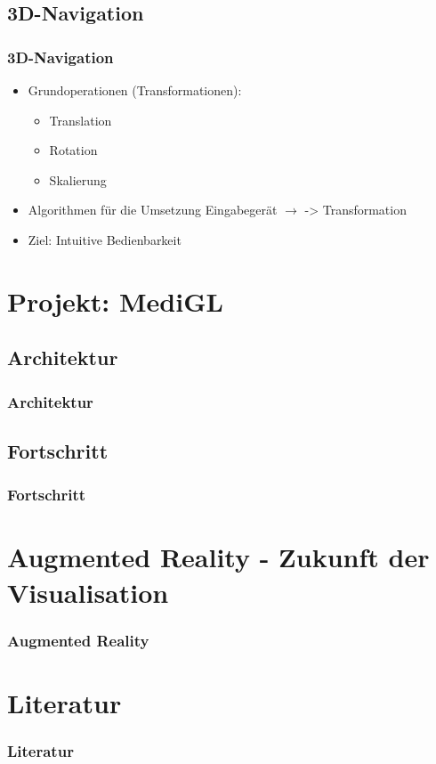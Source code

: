 \documentclass[14pt]{beamer}
\begin{document}
\subsection{3D-Navigation}
\begin{frame}
 \frametitle{3D-Navigation}
 \begin{itemize}
  \item Grundoperationen (Transformationen):
  \begin{itemize}
   \item Translation
   \item Rotation
   \item Skalierung
  \end{itemize}
  \item Algorithmen für die Umsetzung Eingabegerät $\rightarrow$ -> Transformation
  \item Ziel: Intuitive Bedienbarkeit
 \end{itemize}
\end{frame}
%
%
%
\section{Projekt: MediGL}
%
\subsection{Architektur}
\begin{frame}
\frametitle{Architektur}
\end{frame}
%
\subsection{Fortschritt}
\begin{frame}
\frametitle{Fortschritt}
\end{frame}
%
%
%
\section{Augmented Reality - Zukunft der Visualisation}
\begin{frame}
\frametitle{Augmented Reality}
\end{frame}
%
%
%
\section{Literatur}
\begin{frame}
\frametitle{Literatur}
\end{frame}
\end{document}
